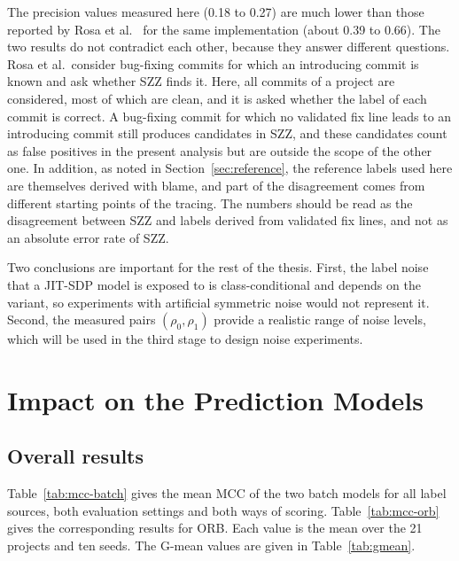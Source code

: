 \documentclass[12pt,a4paper,oneside]{report}
\newcommand{\rhoz}{\rho_0}
\newcommand{\rhoo}{\rho_1}
\begin{document}
The precision values measured here (0.18 to 0.27) are much lower than those
reported by Rosa et al.~\cite{rosa2023szzvariants} for the same
implementation (about 0.39 to 0.66). The two results do not contradict each
other, because they answer different questions. Rosa et al.\ consider
bug-fixing commits for which an introducing commit is known and ask whether
SZZ finds it. Here, all commits of a project are considered, most of which
are clean, and it is asked whether the label of each commit is correct. A
bug-fixing commit for which no validated fix line leads to an introducing
commit still produces candidates in SZZ, and these candidates count as false
positives in the present analysis but are outside the scope of the other one.
In addition, as noted in Section~\ref{sec:reference}, the reference labels
used here are themselves derived with blame, and part of the disagreement
comes from different starting points of the tracing. The numbers should be
read as the disagreement between SZZ and labels derived from validated fix
lines, and not as an absolute error rate of SZZ.

Two conclusions are important for the rest of the thesis. First, the label
noise that a JIT-SDP model is exposed to is class-conditional and depends on
the variant, so experiments with artificial symmetric noise would not
represent it. Second, the measured pairs $(\rhoz,\rhoo)$ provide a realistic
range of noise levels, which will be used in the third stage to design noise
experiments.

\section{Impact on the Prediction Models}\label{sec:res-impact}

\subsection{Overall results}

Table~\ref{tab:mcc-batch} gives the mean MCC of the two batch models for all
label sources, both evaluation settings and both ways of scoring.
Table~\ref{tab:mcc-orb} gives the corresponding results for ORB. Each value
is the mean over the 21 projects and ten seeds. The G-mean values are given
in Table~\ref{tab:gmean}.
\end{document}
